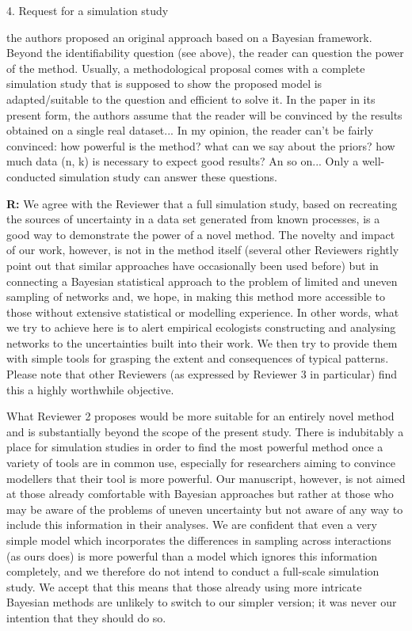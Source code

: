 \documentclass[12pt]{letter}
\newenvironment{refquote}{\bigskip \begin{it}}{\end{it}\smallskip}
\begin{document}
	4. Request for a simulation study 


		\begin{refquote}
			the authors proposed an original approach based on a Bayesian framework. Beyond the identifiability question (see above), the reader can question the power of the method. Usually, a methodological proposal comes with a complete simulation study that is supposed to show  the proposed model is adapted/suitable to the question and efficient to solve it. In the paper in its present form, the authors assume that the reader will be convinced by the results obtained on a single real dataset... In my opinion, the reader can't be fairly convinced: how powerful is the method? what can we say about the priors? how much data (n, k) is necessary to expect good results? An so on... Only a well-conducted simulation study can answer these questions.
		\end{refquote}


		\textbf{R:} We agree with the Reviewer that a full simulation study, based on recreating the sources of uncertainty in a data set generated from known processes, is a good way to demonstrate the power of a novel method. The novelty and impact of our work, however, is not in the method itself (several other Reviewers rightly point out that similar approaches have occasionally been used before) but in connecting a Bayesian statistical approach to the problem of limited and uneven sampling of networks and, we hope, in making this method more accessible to those without extensive statistical or modelling experience. In other words, what we try to achieve here is to alert empirical ecologists constructing and analysing networks to the uncertainties built into their work. We then try to provide them with simple tools for grasping the extent and consequences of typical patterns. Please note that other Reviewers (as expressed by Reviewer 3 in particular) find this a highly worthwhile objective. 


		What Reviewer 2 proposes would be more suitable for an entirely novel method and is substantially beyond the scope of the present study. There is indubitably a place for simulation studies in order to find the most powerful method once a variety of tools are in common use, especially for researchers aiming to convince modellers that their tool is more powerful. Our manuscript, however, is not aimed at those already comfortable with Bayesian approaches but rather at those who may be aware of the problems of uneven uncertainty but not aware of any way to include this information in their analyses. We are confident that even a very simple model which incorporates the differences in sampling across interactions (as ours does) is more powerful than a model which ignores this information completely, and we therefore do not intend to conduct a full-scale simulation study. We accept that this means that those already using more intricate Bayesian methods are unlikely to switch to our simpler version; it was never our intention that they should do so.
\end{document}
